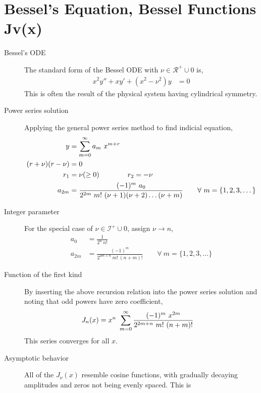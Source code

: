 \section{Bessel's Equation, Bessel Functions Jv(x)}
\begin{description}
    \item[Bessel's ODE] The standard form of the Bessel ODE with
        $ \nu \in \mathcal{R^+} \cup 0 $ is,
        \begin{align}
            x^2y'' + xy' + (x^2 - \nu^2)y & = 0
        \end{align}
        This is often the result of the physical system having cylindrical symmetry.
    \item[Power series solution] Applying the general power series method to find
        indicial equation,
        \begin{align}
            y                & = \sum_{m = 0}^{\infty} a_m\ x^{m+r} \\
            (r + \nu)(r-\nu) & = 0                     \\
            r_1              & = \nu (\geq 0)
            \qquad \qquad r_2 = -\nu                   \\
            a_{2m}           & = \frac{(-1)^m\ a_0}
            {2^{2m}\ m!\ (\nu+1)(\nu+2)\dots(\nu+m)}
            \qquad \forall\ m=\{1,2,3,\dots\}
        \end{align}
    \item[Integer parameter] For the special case of $ \nu \in \mathcal{I^+} \cup 0 $,
        assign $ \nu \rightarrow n $,
        \begin{align}
            a_0    & = \frac{1}{2^n\ n!}                          \\
            a_{2m} & = \frac{(-1)^m}{2^{2m+n}\ m!\ (n+m)!} \qquad
            \forall\ m= \{1,2,3,\dots\}
        \end{align}
    \item[Function of the first kind] By inserting the above recursion relation into the
        power series solution and noting that odd powers have zero coefficient,
        \begin{align}
            J_n(x) & = x^n\ \iser{0} \frac{(-1)^m\ x^{2m}}{2^{2m+n}\ m!\ (n+m)!}
        \end{align}
        This series converges for all $ x $.
    \item[Asymptotic behavior] All of the $ J_{\nu}(x) $ resemble cosine functions,
        with gradually decaying amplitudes and zeros not being evenly spaced. This is

\end{description}
